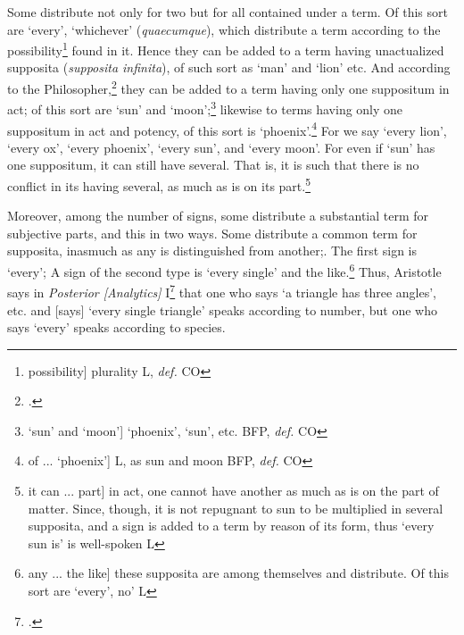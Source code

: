 \begin{itemize}
Some distribute not only for two but for all contained under a term. Of this sort are `every', `whichever' (\textit{quaecumque}), which distribute a term according to the possibility\footnote{possibility] plurality L, \textit{def.} CO} found in it. Hence they can be added to a term having unactualized supposita (\textit{supposita infinita}), of such sort as `man' and `lion' etc. And according to the Philosopher,\footnote{\cite[I. 1, p. 268a.15-19]{AristotleDeCaelo}.} they can be added to a term having only one suppositum in act; of this sort are `sun' and `moon';\footnote{`sun' and `moon'] `phoenix', `sun', etc. BFP, \textit{def.} CO} likewise to terms having only one suppositum in act and potency, of this sort is `phoenix'.\footnote{of ... `phoenix'] L, as sun and moon BFP, \textit{def.} CO} For we say `every lion', `every ox', `every phoenix', `every sun', and `every moon'. For even if `sun' has one suppositum, it can still have several. That is, it is such that there is no conflict in its having several, as much as is on its part.\footnote{it can ... part] in act, one cannot have another as much as is on the part of matter. Since, though, it is not repugnant to sun to be multiplied in several supposita, and a sign is added to a term by reason of its form, thus `every sun is' is well-spoken L}

Moreover, among the number of signs, some distribute a substantial term for subjective parts, and this in two ways. Some distribute a common term for supposita, inasmuch as any is distinguished from another;. The first sign is `every'; A sign of the second type is `every single' and the like.\footnote{any ... the like] these supposita are among themselves and distribute. Of this sort are `every', no' L} Thus, Aristotle says in \textit{Posterior [Analytics]} I\footnote{\cite[I. 4, pp. 73b.25-74a.3]{Post.An}.} that one who says `a triangle has three angles', etc. and [says] `every single triangle' speaks according to number, but one who says `every' speaks according to species.


\end{itemize}
